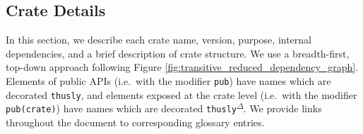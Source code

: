 \documentclass[12pt,a4paper]{article}
\begin{document}
\subsection{Crate Details}\label{sec:crate_summaries}

In this section, we describe each crate name, version, purpose, internal dependencies, and a brief description of crate structure. We use a breadth-first, top-down approach following Figure \ref{fig:transitive_reduced_dependency_graph}. Elements of public APIs (i.e.\ with the modifier \texttt{pub}) have names which are decorated \texttt{thusly}\textsuperscript{\textdagger}, and elements exposed at the crate level (i.e.\ with the modifier \texttt{pub(crate)}) have names which are decorated \texttt{thusly}\textsuperscript{$\Delta$}. We provide links throughout the document to corresponding glossary entries.

\end{document}
